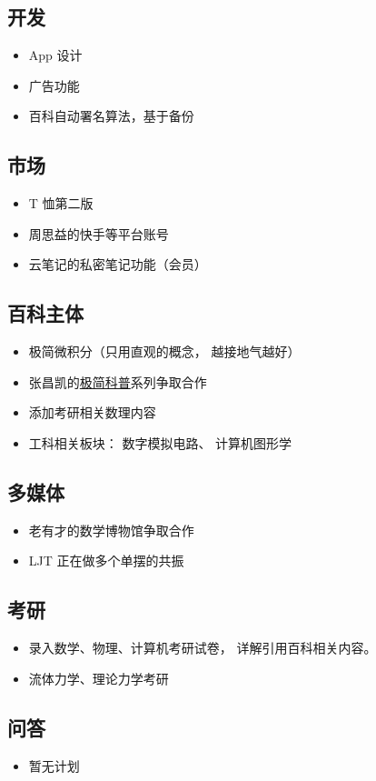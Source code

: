 
\subsection{开发}
\begin{itemize}
\item App 设计
\item 广告功能
\item 百科自动署名算法，基于备份
\end{itemize}

\subsection{市场}
\begin{itemize}
\item T 恤第二版
\item 周思益的快手等平台账号
\item 云笔记的私密笔记功能（会员）
\end{itemize}

\subsection{百科主体}
\begin{itemize}
\item 极简微积分（只用直观的概念， 越接地气越好）
\item 张昌凯的\href{https://www.zhihu.com/column/c_1328480072068386816}{极简科普}系列争取合作
\item 添加考研相关数理内容
\item 工科相关板块： 数字模拟电路、 计算机图形学
\end{itemize}

\subsection{多媒体}
\begin{itemize}
\item 老有才的数学博物馆争取合作
\item LJT 正在做多个单摆的共振
\end{itemize}

\subsection{考研}
\begin{itemize}
\item 录入数学、物理、计算机考研试卷， 详解引用百科相关内容。
\item 流体力学、理论力学考研
\end{itemize}

\subsection{问答}
\begin{itemize}
\item 暂无计划
\end{itemize}
